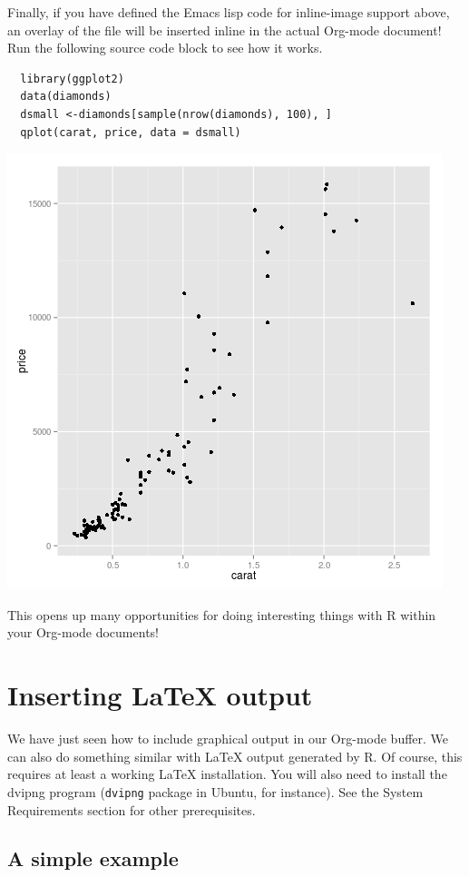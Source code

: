 \documentclass[11pt]{article}
\begin{document}
Finally, if you have defined the Emacs lisp code for inline-image
support above, an overlay of the file will be inserted inline in the
actual Org-mode document! Run the following source code block to see
how it works.

\begin{verbatim}
  library(ggplot2)
  data(diamonds)
  dsmall <-diamonds[sample(nrow(diamonds), 100), ] 
  qplot(carat, price, data = dsmall)
\end{verbatim}

\includegraphics[width=.9\linewidth]{diamonds.png}

This opens up many opportunities for doing interesting things with R
within your Org-mode documents!
\section*{Inserting \LaTeX{} output}
\label{sec-6}

We have just seen how to include graphical output in our Org-mode
buffer. We can also do something similar with \LaTeX{} output generated
by R. Of course, this requires at least a working \LaTeX{}
installation. You will also need to install the dvipng program
(\texttt{dvipng} package in Ubuntu, for instance). See the System
Requirements section for other prerequisites.

\subsection*{A simple example}
\label{sec-6-1}
\end{document}

